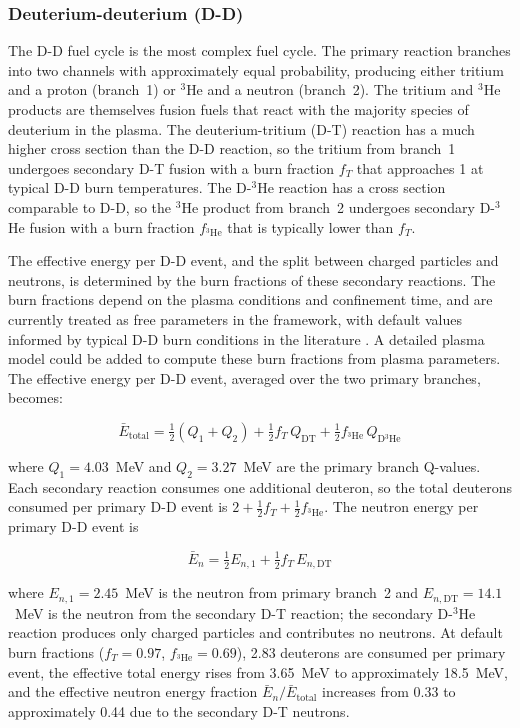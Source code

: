 \documentclass{article}
\begin{document}
\subsubsection{Deuterium-deuterium (D-D)}
The D-D fuel cycle is the most complex fuel cycle. The primary reaction
branches into two channels with approximately equal probability, producing
either tritium and a proton (branch~1) or ${}^3$He and a neutron (branch~2).
The tritium and ${}^3$He products are themselves fusion fuels that react
with the majority species of deuterium in the plasma. The deuterium-tritium
(D-T) reaction has a much higher cross section than the D-D reaction, so the tritium
from branch~1 undergoes secondary D-T fusion with a burn fraction $f_T$ that
approaches 1 at typical D-D burn temperatures. The D-${}^3$He reaction
has a cross section comparable to D-D, so the ${}^3$He product
from branch~2 undergoes secondary D-${}^3$He fusion with a burn fraction 
$f_{{}^3\text{He}}$ that is typically lower than $f_T$.

The effective energy per D-D event, and the split between charged particles and neutrons,
is determined by the burn fractions of these secondary reactions. 
The burn fractions depend on the plasma conditions and confinement time, and are
currently treated as free parameters in the framework, with default values
informed by typical D-D burn conditions in the literature \citep{huba2016}.
A detailed plasma model could be added to compute these burn fractions from plasma parameters.
The effective energy per D-D event, averaged over the two primary branches, becomes:

\begin{equation}
\label{eq:dd-etotal}
\bar{E}_{\text{total}} = \tfrac{1}{2}(Q_1 + Q_2)
  + \tfrac{1}{2} f_T \, Q_{\text{DT}}
  + \tfrac{1}{2} f_{{}^3\text{He}} \, Q_{\text{D}{}^3\text{He}}
\end{equation}

\noindent where $Q_1 = 4.03$~MeV and $Q_2 = 3.27$~MeV are the primary
branch Q-values. Each secondary reaction consumes one additional
deuteron, so the total deuterons consumed per primary D-D event is
$2 + \tfrac{1}{2} f_T + \tfrac{1}{2} f_{{}^3\text{He}}$.
The neutron energy per primary D-D event is

\begin{equation}
\label{eq:dd-eneutron}
\bar{E}_n = \tfrac{1}{2} E_{n,1} + \tfrac{1}{2} f_T \, E_{n,\text{DT}}
\end{equation}

\noindent where $E_{n,1} = 2.45$~MeV is the neutron from primary branch~2
and $E_{n,\text{DT}} = 14.1$~MeV is the neutron from the secondary D-T
reaction; the secondary D-${}^3$He reaction produces only charged
particles and contributes no neutrons.
At default burn fractions ($f_T = 0.97$,
$f_{{}^3\text{He}} = 0.69$), 2.83 deuterons are consumed per primary
event, the effective total energy rises from
3.65~MeV to approximately 18.5~MeV, and the effective
neutron energy fraction $\bar{E}_n / \bar{E}_{\text{total}}$ increases from
0.33 to approximately 0.44 due to the secondary D-T neutrons.
\end{document}
